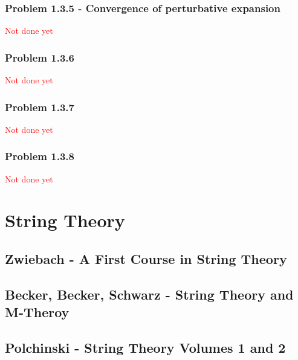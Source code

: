 \documentclass[10pt,a4paper]{article}
\theoremstyle{definition}
\begin{document}
\subsubsection{Problem 1.3.5 - Convergence of perturbative expansion}
\textcolor{red}{Not done yet}

\subsubsection{Problem 1.3.6}
\textcolor{red}{Not done yet}

\subsubsection{Problem 1.3.7}
\textcolor{red}{Not done yet}

\subsubsection{Problem 1.3.8}
\textcolor{red}{Not done yet}



\section{String Theory}
\subsection{{\sc Zwiebach} - A First Course in String Theory }

\subsection{{\sc Becker, Becker, Schwarz} - String Theory and M-Theroy }

\subsection{{\sc Polchinski} - String Theory Volumes 1 and 2 }
\end{document}
